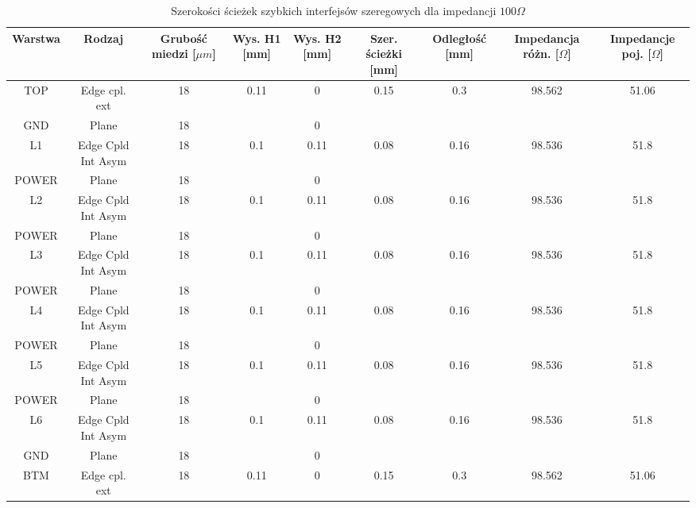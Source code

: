 \begin{sidewaystable}[h]
\centering
    \scriptsize
	\caption{Szerokości ścieżek szybkich interfejsów szeregowych dla impedancji $100 \Omega$}
 \begin{tabular}{c  | c |  c | c |c | c | c  | c  | c}
\hline
    \textbf{Warstwa} & \textbf{Rodzaj} & \textbf{Grubość miedzi [$\mu m$]} & \textbf{Wys. H1 [mm]} & \textbf{Wys. H2 [mm]} & \textbf{Szer. ścieżki [mm]}  & \textbf{Odległość [mm]}   & \textbf{Impedancja różn. [$\Omega$]}   & \textbf{Impedancje poj. [$\Omega$]}\\

    \hline
    \hline
    TOP 	& 	Edge cpl. ext 		&	18	&	0.11	&	0	& 	0.15	&	0.3	&	98.562	&	51.06	\\
    GND 	& 	Plane		 		&	18	&		&	0	& 		&		&			&		\\	
    L1 		& 	Edge Cpld Int Asym 	&	18	&	0.1	&	0.11	& 	0.08	&	0.16	&	98.536	&	51.8	\\
    POWER 	& 	Plane		 		&	18	&		&	0	& 		&		&			&		\\
    L2		& 	Edge Cpld Int Asym 	&	18	&	0.1	&	0.11	& 	0.08	&	0.16	&	98.536	&	51.8	\\
    POWER 	& 	Plane		 		&	18	&		&	0	& 		&		&			&		\\
    L3		& 	Edge Cpld Int Asym 	&	18	&	0.1	&	0.11	& 	0.08	&	0.16	&	98.536	&	51.8	\\
    POWER 	& 	Plane		 		&	18	&		&	0	& 		&		&			&		\\
    L4		& 	Edge Cpld Int Asym 	&	18	&	0.1	&	0.11	& 	0.08	&	0.16	&	98.536	&	51.8	\\
    POWER 	& 	Plane		 		&	18	&		&	0	& 		&		&			&		\\
    L5 		& 	Edge Cpld Int Asym 	&	18	&	0.1	&	0.11	& 	0.08	&	0.16	&	98.536	&	51.8	\\
    POWER 	& 	Plane		 		&	18	&		&	0	& 		&		&			&		\\
    L6 		& 	Edge Cpld Int Asym 	&	18	&	0.1	&	0.11	& 	0.08	&	0.16	&	98.536	&	51.8	\\
    GND 	& 	Plane		 		&	18	&		&	0	& 		&		&			&		\\
    BTM 	& 	Edge cpl. ext 		&	18	&	0.11	&	0	& 	0.15	&	0.3	&	98.562	&	51.06	\\

    
	\toprule
    \end{tabular}

	\label{tbl:serdes_width}
%


\end{sidewaystable}
